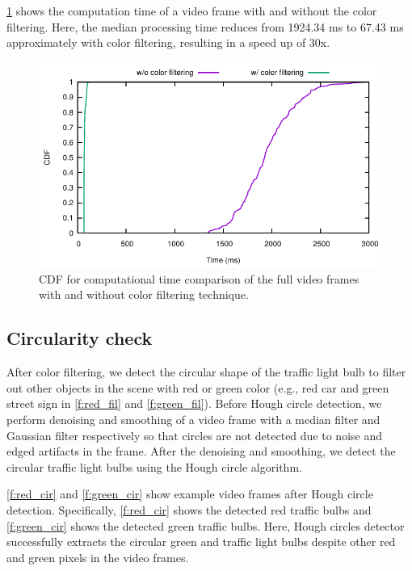 

\ref{f:clrfil} shows the computation time of a video frame with and without the color filtering. 
Here, the median processing time reduces from 1924.34 ms to 67.43 ms approximately with color filtering, resulting in a speed up of 30x. 


\begin{figure}[!ht]
\centering
\includegraphics[width=5.2in]{plots/cdf_clrfil_full.pdf}
\caption{CDF for computational time comparison of the full video frames with and without color filtering technique.}
\label{f:clrfil}
\end{figure}


\subsection{Circularity check}
After color filtering, we detect the circular shape of the traffic light bulb to filter out other objects in the scene with red or green color (e.g., red car and green street sign in \ref{f:red_fil} and \ref{f:green_fil}).
Before Hough circle detection, we perform denoising and smoothing of a video frame with a median filter and Gaussian filter respectively so that circles are not detected due to noise and edged artifacts in the frame.
After the denoising and smoothing, we detect the circular traffic light bulbs using the Hough circle algorithm.

\ref{f:red_cir} and \ref{f:green_cir} show example video frames after Hough circle detection.
Specifically, \ref{f:red_cir} shows the detected red traffic bulbs and \ref{f:green_cir} shows the detected green traffic bulbs.
Here, Hough circles detector successfully extracts the circular green and traffic light bulbs despite other red and green pixels in the video frames.



